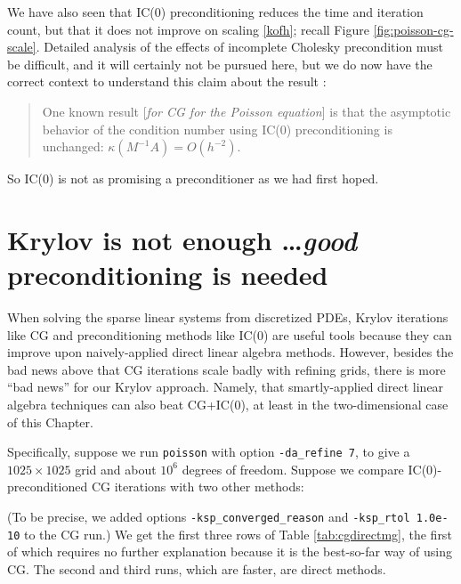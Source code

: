 We have also seen that IC($0$) preconditioning reduces the time and iteration count, but that it does not improve on scaling \eqref{kofh}; recall Figure \ref{fig:poisson-cg-scale}.  Detailed analysis of the effects of incomplete Cholesky precondition must be difficult, and it will certainly not be pursued here, but we do now have the correct context to understand this claim about the result \citet[][p.~82]{Elmanetal2005}:
\begin{quote}
One known result [\emph{for CG for the Poisson equation}] is that the asymptotic behavior of the condition number using IC($0$) preconditioning is unchanged: $\kappa(M^{-1} A) = O(h^{-2})$.
\end{quote}
So IC($0$) is not as promising a preconditioner as we had first hoped.


\section{Krylov is not enough \dots \emph{good} preconditioning is needed}

When solving the sparse linear systems from discretized PDEs, Krylov iterations like CG and preconditioning methods like IC($0$) are useful tools because they can improve upon naively-applied direct linear algebra methods.  However, besides the bad news above that CG iterations scale badly with refining grids, there is more ``bad news'' for our Krylov approach.  Namely, that smartly-applied direct linear algebra techniques can also beat CG+IC($0$), at least in the two-dimensional case of this Chapter.

Specifically, suppose we run \texttt{poisson} with option \texttt{-da\_refine 7}, to give a $1025 \times 1025$ grid and about $10^6$ degrees of freedom.  Suppose we compare IC($0$)-preconditioned CG iterations with two other methods:
(To be precise, we added options \texttt{-ksp\_converged\_reason} and \texttt{-ksp\_rtol 1.0e-10} to the CG run.)  We get the first three rows of Table \ref{tab:cgdirectmg}, the first of which requires no further explanation because it is the best-so-far way of using CG.  The second and third runs, which are faster, are direct methods.

